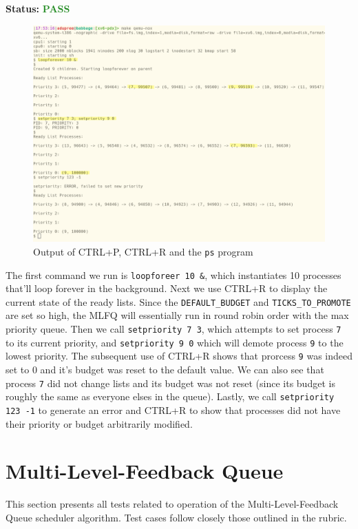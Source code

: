 \documentclass[11pt,letterpaper]{report}
\newcommand{\code}[1]{\colorbox{codegray}{\texttt{#1}}}
\begin{document}
{  \noindent\textbf{Status:} \textcolor{ForestGreen}{\textbf{PASS}}
  
  \begin{figure}[h!]
	\centering
	\includegraphics[width=1\linewidth]{setpriority.png}
	\caption[img]{Output of CTRL+P, CTRL+R and the \code{ps} program}
	\label{fig:P1compileP0-1}
  \end{figure}

  The first command we run is \code{loopforeer 10 \&}, which instantiates 10 processes that'll 
  loop forever in the background. Next we use CTRL+R to display the current state of the ready
  lists. Since the \code{DEFAULT\_BUDGET} and \code{TICKS\_TO\_PROMOTE} are set so high, the 
  MLFQ will essentially run in round robin order with the max priority queue. Then we call 
  \code{setpriority 7 3}, which attempts to set process \code{7} to its current priority, 
  and \code{setpriority 9 0} which will demote process \code{9} to the lowest priority. The 
  subsequent use of CTRL+R shows that prorcess \code{9} was indeed set to 0 and it's budget was
  reset to the default value. We can also see that process \code{7} did not change lists and its
  budget was not reset (since its budget is roughly the same as everyone elses in the queue).
  Lastly, we call \code{setpriority 123 -1} to generate an error and CTRL+R to show that processes
  did not have their priority or budget arbitrarily modified. 
  
  \pagebreak

  \section*{Multi-Level-Feedback Queue}
  This section presents all tests related to operation of the Multi-Level-Feedback Queue 
  scheduler algorithm. Test cases follow closely those outlined in the rubric. \hfill \break
  
}
\end{document}

